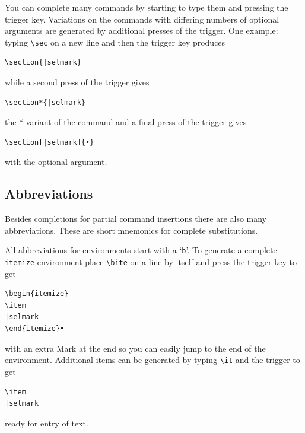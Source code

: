 \documentclass[11pt]{article}
\newcommand{\cmd}[1]{\texttt{#1}}
\begin{document}
You can complete many commands by starting to type them and pressing the trigger key. Variations on the commands with differing numbers of optional arguments are generated by additional presses of the trigger. One example: typing \verb|\sec| on a new line and then the trigger key produces
\begin{verbatim}
\section{|selmark}
\end{verbatim}
while a second press of the trigger gives
\begin{verbatim}
\section*{|selmark}
\end{verbatim}
the *-variant of the command and a final press of the trigger gives
\begin{verbatim}
\section[|selmark]{•}
\end{verbatim}
with the optional argument.

\subsection*{Abbreviations}

Besides completions for partial command insertions there are also many abbreviations. These are short mnemonics for complete substitutions. 

All abbreviations for environments start with a `\texttt{b}'. To generate a complete \cmd{itemize} environment place \verb|\bite| on a line by itself and press the trigger key to get
\begin{verbatim}
\begin{itemize}
\item
|selmark
\end{itemize}•
\end{verbatim}
with an extra Mark at the end so you can easily jump to the end of the environment. Additional items can be generated by typing \verb|\it| and the trigger to get
\begin{verbatim}
\item
|selmark
\end{verbatim}
ready for entry of text.
\end{document}
